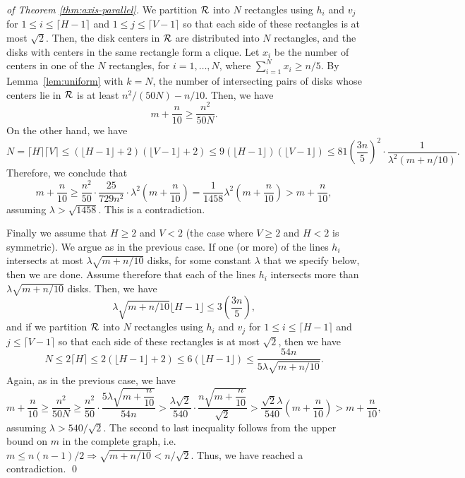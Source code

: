 \documentclass{llncs}
\begin{document}
\begin{proof}[of Theorem \ref{thm:axis-parallel}]
We partition $\cal{R}$ into $N$ rectangles 
using $h_i$ and $v_j$ for $1 \leq i \leq \lceil H-1 \rceil$ and $1 \leq j \leq \lceil V-1 \rceil$
so that each side of these rectangles is at most $\sqrt{2}$. 
Then, the disk centers in $\cal{R}$ are distributed into $N$ rectangles, and the disks with centers in the same rectangle form a clique.
Let $x_i$ be the number of centers in one of the $N$ rectangles, for $i=1,\ldots, N$, where $\sum_{i=1}^N x_i \geq n/5$.
By Lemma~\ref{lem:uniform} with $k=N$, the number of intersecting pairs of disks whose centers lie in $\cal{R}$ is at least $n^2/(50N) - n/10$.  Then, we have 
\[
m + \frac{n}{10} \geq \frac{n^2}{50N}.
\]
On the other hand, we have 
\[
N = \lceil H \rceil \lceil V \rceil \leq (\lfloor H -1 \rfloor + 2) (\lfloor V -1 \rfloor + 2) \leq 9 (\lfloor H -1 \rfloor) (\lfloor V -1 \rfloor)
\leq 81 \left(\frac{3n}{5}\right)^2 \cdot \frac{1}{\lambda^2 (m+n/10)}.
\]
Therefore, we conclude that
\[ m + \frac{n}{10}
\geq \frac{n^2}{50} \cdot \frac{25}{729n^2} \cdot \lambda^2 \left(m+\frac{n}{10}\right)
= \frac{1}{1458} \lambda^2 \left(m+\frac{n}{10}\right)
> m+\frac{n}{10},
\]
assuming $\lambda > \sqrt{1458}$.
This is a contradiction.


Finally we assume that $H \geq 2$ and $V < 2$ (the case where $V \geq 2$ and $H < 2$ is symmetric).
We argue as in the previous case.
If one (or more) of the lines $h_i$ intersects at most $\lambda \sqrt{m+n/10}$ disks, for some constant $\lambda$ that we specify below, then we are done.
Assume therefore that each of the lines $h_i$ intersects more than $\lambda \sqrt{m+n/10}$ disks.
Then, we have 
\[
\lambda \sqrt{m+n/10} \lfloor H-1 \rfloor  \leq 3\left(\frac{3n}{5}\right),
\]
and if we partition $\cal{R}$ into $N$ rectangles 
using $h_i$ and $v_j$ for $1 \leq i \leq \lceil H-1 \rceil$ and $j \leq \lceil V-1 \rceil$
so that each side of these rectangles is at most $\sqrt{2}$, then we have
\[
N 
\leq 2 \lceil H \rceil  \leq 2 (\lfloor H -1 \rfloor + 2) \leq 6 (\lfloor H -1 \rfloor) \leq \frac{54n}{5\lambda\sqrt{m+n/10}}.
\]
Again, as in the previous case, we have
\[
m + \frac{n}{10} \geq \frac{n^2}{50N} \geq \frac{n^2}{50} \cdot \frac{5 \lambda \sqrt{m+\dfrac{n}{10}}}{54n} >  \frac{\lambda\sqrt{2}}{540} \cdot \frac{n \sqrt{m+\dfrac{n}{10}}}{\sqrt{2}} > \frac{\sqrt{2}\lambda}{540} \left(m +\frac{n}{10}\right) > m+\frac{n}{10},
\]
assuming $\lambda > 540/\sqrt{2}$.
The second to last inequality follows from the upper bound on $m$ in the complete graph, i.e.\ $m \leq n(n-1)/2 \Rightarrow \sqrt{m+n/10} < n/\sqrt{2}$.
Thus, we have reached a contradiction.
\qed
\end{proof}
\end{document}
